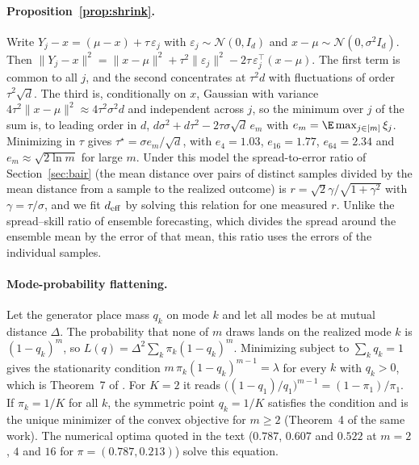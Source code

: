 \paragraph{Proposition~\ref{prop:shrink}.}
Write $Y_j - x = (\mu - x) + \tau\,\varepsilon_j$ with $\varepsilon_j \sim \mathcal{N}(0, I_d)$ and $x - \mu \sim \mathcal{N}(0, \sigma^2 I_d)$. Then $\|Y_j - x\|^2 = \|x - \mu\|^2 + \tau^2 \|\varepsilon_j\|^2 - 2 \tau\, \varepsilon_j^\top (x - \mu)$. The first term is common to all $j$, and the second concentrates at $\tau^2 d$ with fluctuations of order $\tau^2 \sqrt{d}$. The third is, conditionally on $x$, Gaussian with variance $4 \tau^2 \|x - \mu\|^2 \approx 4 \tau^2 \sigma^2 d$ and independent across $j$, so the minimum over $j$ of the sum is, to leading order in $d$, $d\sigma^2 + d \tau^2 - 2 \tau \sigma \sqrt{d}\, e_m$ with $e_m = \E \max_{j \in [m]} \xi_j$. Minimizing in $\tau$ gives $\tau^\star = \sigma e_m / \sqrt{d}$, with $e_4 = 1.03$, $e_{16} = 1.77$, $e_{64} = 2.34$ and $e_m \approx \sqrt{2 \ln m}$ for large $m$. Under this model the spread-to-error ratio of Section~\ref{sec:bair} (the mean distance over pairs of distinct samples divided by the mean distance from a sample to the realized outcome) is $r = \sqrt{2}\gamma/\sqrt{1 + \gamma^2}$ with $\gamma = \tau/\sigma$, and we fit $d_{\mathrm{eff}}$ by solving this relation for one measured $r$. Unlike the spread--skill ratio of ensemble forecasting, which divides the spread around the ensemble mean by the error of that mean, this ratio uses the errors of the individual samples.

\paragraph{Mode-probability flattening.}
Let the generator place mass $q_k$ on mode $k$ and let all modes be at mutual distance $\Delta$. The probability that none of $m$ draws lands on the realized mode $k$ is $(1 - q_k)^m$, so $L(q) = \Delta^2 \sum_k \pi_k (1 - q_k)^m$. Minimizing subject to $\sum_k q_k = 1$ gives the stationarity condition $m\, \pi_k (1 - q_k)^{m-1} = \lambda$ for every $k$ with $q_k > 0$, which is Theorem~7 of \citet{bennett2026freedom}. For $K{=}2$ it reads $\big((1-q_1)/q_1\big)^{m-1} = (1-\pi_1)/\pi_1$. If $\pi_k = 1/K$ for all $k$, the symmetric point $q_k = 1/K$ satisfies the condition and is the unique minimizer of the convex objective for $m \ge 2$ (Theorem~4 of the same work). The numerical optima quoted in the text ($0.787$, $0.607$ and $0.522$ at $m = 2$, $4$ and $16$ for $\pi = (0.787, 0.213)$) solve this equation.

